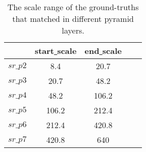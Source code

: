 \documentclass[10pt,twocolumn,letterpaper]{article}
\begin{document}
\begin{table}[h]
\small
\renewcommand\arraystretch{1.1}
	\begin{center}
	\setlength{\tabcolsep}{20pt}
	\begin{tabular}{c|cccc}
		\hline
		   & start\underline{ }scale & end\underline{ }scale \\
		\hline
	    $sr\_p2$ & 8.4 & 20.7 \\
	    $sr\_p3$ & 20.7 & 48.2 \\
	    $sr\_p4$ & 48.2 & 106.2 \\
	    $sr\_p5$ & 106.2 & 212.4 \\
	    $sr\_p6$ & 212.4 & 420.8 \\
	    $sr\_p7$ & 420.8 & 640 \\
		\hline				
	\end{tabular}
	\end{center}
\vspace{-10pt}
\caption{The scale range of the ground-truths that matched in different pyramid layers. 
}
\label{table_4}
\end{table}
\end{document}
